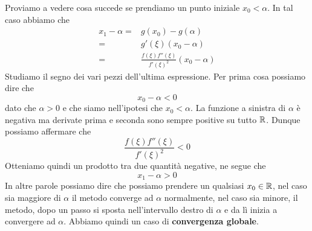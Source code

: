 \begin{example}
	Proviamo a vedere cosa succede se prendiamo un punto iniziale $x_0 < \alpha$. In tal caso abbiamo che
	\begin{align*}
		x_1 - \alpha = & g(x_0) - g(\alpha)                               \\
		=              & g'(\xi) (x_0 - \alpha)                           \\
		=              & \frac{f(\xi) f''(\xi)}{f'(\xi)^2} (x_0 - \alpha)
	\end{align*}
	Studiamo il segno dei vari pezzi dell'ultima espressione. Per prima cosa possiamo dire che
	\[ x_0 - \alpha < 0 \]
	dato che $\alpha > 0$ e che siamo nell'ipotesi che $x_0 < \alpha$. La funzione a sinistra di $\alpha$ è
	negativa ma derivate prima e seconda sono sempre positive su tutto $\mathbb{R}$. Dunque possiamo affermare che
	\[ \frac{f(\xi) f''(\xi)}{f'(\xi)^2} < 0 \]
	Otteniamo quindi un prodotto tra due quantità negative, ne segue che
	\[ x_1 - \alpha > 0 \]
	In altre parole possiamo dire che possiamo prendere un qualsiasi $x_0 \in \mathbb{R}$, nel caso sia maggiore di
	$\alpha$ il metodo converge ad $\alpha$ normalmente, nel caso sia minore, il metodo, dopo un passo si sposta
	nell'intervallo destro di $\alpha$ e da lì inizia a convergere ad $\alpha$. Abbiamo quindi un caso di
	\textbf{convergenza globale}.
\end{example}
